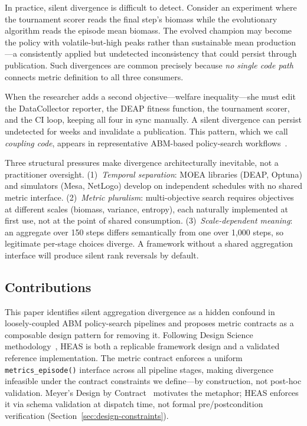 \documentclass{wscpaperproc}
\begin{document}
In practice, silent divergence is difficult to detect. Consider an experiment
where the tournament scorer reads the final step's biomass while the
evolutionary algorithm reads the episode mean biomass. The evolved champion may
become the policy with volatile-but-high peaks rather than sustainable mean
production---a consistently applied but undetected inconsistency that could
persist through publication. Such divergences are common precisely because
\emph{no single code path} connects metric definition to all three consumers.

When the researcher adds a second objective---welfare inequality---she must edit
the DataCollector reporter, the DEAP fitness function, the tournament scorer, and
the CI loop, keeping all four in sync manually. A silent divergence can persist
undetected for weeks and invalidate a publication. This pattern, which we call
\emph{coupling code}, appears in representative ABM-based policy-search
workflows~\cite{pangallo2019best,capri2023transport}.

Three structural pressures make divergence architecturally inevitable, not a
practitioner oversight. (1)~\emph{Temporal separation}: MOEA libraries (DEAP,
Optuna) and simulators (Mesa, NetLogo) develop on independent schedules with no
shared metric interface. (2)~\emph{Metric pluralism}: multi-objective search
requires objectives at different scales (biomass, variance, entropy), each
naturally implemented at first use, not at the point of shared consumption.
(3)~\emph{Scale-dependent meaning}: an aggregate over 150 steps differs
semantically from one over 1,000 steps, so legitimate per-stage choices diverge.
A framework without a shared aggregation interface will produce silent rank
reversals by default.

\subsection{Contributions}
\label{sec:intro-contributions}

This paper identifies silent aggregation divergence as a hidden confound in
loosely-coupled ABM policy-search pipelines and proposes metric contracts as a
composable design pattern for removing it. Following Design Science
methodology~\cite{hevner2004design}, HEAS is both a replicable framework design
and a validated reference implementation. The metric contract enforces a uniform
\texttt{metrics\_episode()} interface across all pipeline stages, making
divergence infeasible under the contract constraints we
define---by construction, not post-hoc validation. Meyer's Design by
Contract~\cite{meyer1997object} motivates the metaphor; HEAS enforces it via
schema validation at dispatch time, not formal pre/postcondition verification
(Section~\ref{sec:design-constraints}).
\end{document}
